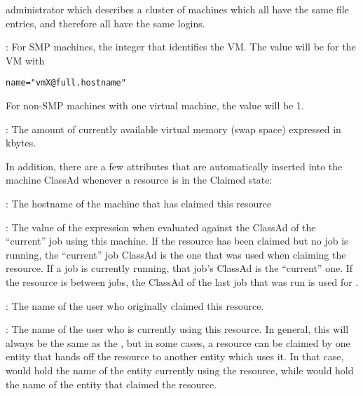 \begin{description}
administrator which describes a cluster of machines which all have 
the same  file entries, and therefore all have the same logins.
%
\item[\AdAttr{VirtualMachineID}] : For SMP machines, the integer
that identifies the VM.
The value will be \verb@X@ for the VM with 
\begin{verbatim}
name="vmX@full.hostname"
\end{verbatim}
For non-SMP machines with one virtual machine, the value will be 1.
%
\item[\AdAttr{VirtualMemory}] : The amount of currently available virtual memory 
(swap space) expressed in kbytes.

\end{description}

In addition, there are a few attributes that are automatically
inserted into the machine ClassAd whenever a resource is in the
Claimed state:

\begin{description}

\item[\AdAttr{ClientMachine}] : The hostname of the machine that has
claimed this resource

\item[\AdAttr{CurrentRank}] : The value of the  expression
when evaluated against the ClassAd of the ``current'' job using this
machine.
If the resource has been claimed but no job is running, the
``current'' job ClassAd is the one that was used when claiming the
resource.
If a job is currently running, that job's ClassAd is the ``current''
one.  
If the resource is between jobs, the ClassAd of the last job that was
run is used for .

\item[\AdAttr{RemoteOwner}] : The name of the user who originally
claimed this resource.

\item[\AdAttr{RemoteUser}] : The name of the user who is currently
using this resource.
In general, this will always be the same as the ,
but in some cases, a resource can be claimed by one entity that hands
off the resource to another entity which uses it.
In that case,  would hold the name of the entity
currently using the resource, while  would hold
the name of the entity that claimed the resource.

\end{description}

